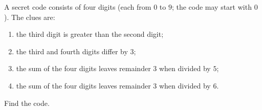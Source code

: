 A secret code consists of four digits (each from $0$ to $9$; the code may start with $0$). The clues are:
\begin{enumerate}
\item[(a)] the third digit is greater than the second digit;
\item[(b)] the third and fourth digits differ by $3$;
\item[(c)] the sum of the four digits leaves remainder $3$ when divided by $5$;
\item[(d)] the sum of the four digits leaves remainder $3$ when divided by $6$.
\end{enumerate}
Find the code.
